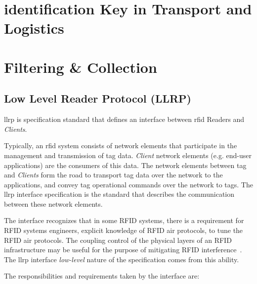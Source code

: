 

\section{identification Key in Transport and Logistics}

\section{Filtering \& Collection}

\subsection{Low Level Reader Protocol (LLRP)}


\ac{llrp} is specification standard that defines an interface between \ac{rfid} Readers and \emph{Clients}.

Typically, an \ac{rfid} system consists of network elements that participate in the management and transmission of tag data.
\emph{Client} network elements (e.g. end-user applications) are the consumers of this data.
The network elements between tag and \emph{Clients} form the road to transport tag data over the network to the applications, and convey tag operational commands over the network to tags.
The \ac{llrp} interface specification is the standard that describes the communication between these network elements.


The interface recognizes that in some RFID systems, there is a requirement for RFID systems engineers, explicit knowledge of RFID air protocols, to tune the RFID air protocols. 
The coupling control of the physical layers of an RFID infrastructure may be useful for the purpose of mitigating RFID interference~\cite{Llrp1standard20101013Pdf}.
The \ac{llrp} interface \emph{low-level} nature of the specification comes from this ability.

The responsibilities and requirements taken by the interface are:

